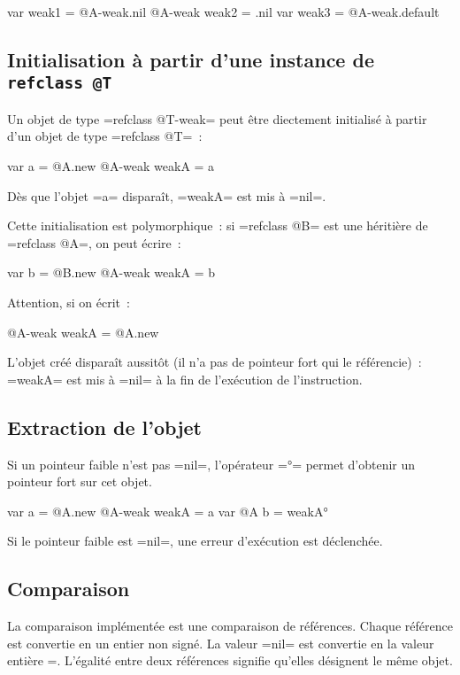 \begin{galgas}
  var weak1 = @A-weak.nil
  @A-weak weak2 = .nil
  var weak3 = @A-weak.default
\end{galgas}


\subsection{Initialisation à partir d'une instance de \texttt{refclass @T}}

Un objet de type \ggs=refclass @T-weak= peut être diectement initialisé à partir d'un objet de type \ggs=refclass @T=~:
\begin{galgas}
  var a = @A.new
  @A-weak weakA = a
\end{galgas}

Dès que l'objet \ggs=a= disparaît, \ggs=weakA= est mis à \ggs=nil=.

Cette initialisation est polymorphique~: si \ggs=refclass @B= est une héritière de \ggs=refclass @A=, on peut écrire~:
\begin{galgas}
  var b = @B.new
  @A-weak weakA = b
\end{galgas}

Attention, si on écrit~:
\begin{galgas}
  @A-weak weakA = @A.new
\end{galgas}
L'objet créé disparaît aussitôt (il n'a pas de pointeur fort qui le référencie)~: \ggs=weakA= est mis à \ggs=nil= à la fin de l'exécution de l'instruction.


\subsection{Extraction de l'objet}

Si un pointeur faible n'est pas \ggs=nil=, l'opérateur \ggs=°= permet d'obtenir un pointeur fort sur cet objet.
\begin{galgas}
  var a = @A.new
  @A-weak weakA = a
  var @A b = weakA°
\end{galgas}
Si le pointeur faible est \ggs=nil=, une erreur d'exécution est déclenchée.



\subsection{Comparaison}

La comparaison implémentée est une comparaison de références. Chaque référence est convertie en un entier non signé. La valeur \ggs=nil= est convertie en la valeur entière =. L'égalité entre deux références signifie qu'elles désignent le même objet. 

